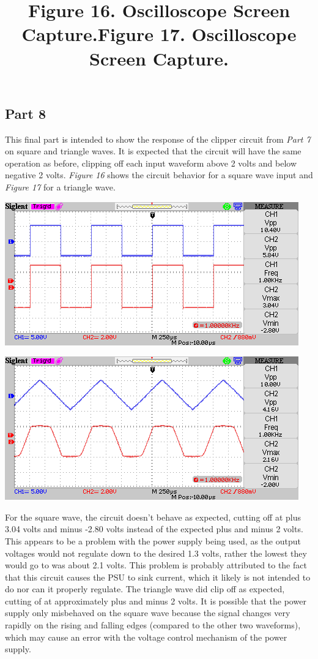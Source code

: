 \documentclass[12pt]{article}
\begin{document}
\pagebreak

\subsection*{Part 8}
This final part is intended to show the response of the clipper circuit from \textit{Part 7} on square and triangle waves. It is expected that the circuit will have the same operation as before, clipping off each input waveform above 2 volts and below negative 2 volts. \textit{Figure 16} shows the circuit behavior for a square wave input and \textit{Figure 17} for a triangle wave.\par
%
\vspace{12pt}\title{\textbf{Figure 16.} Oscilloscope Screen Capture.}
\begin{center}
  \includegraphics[scale=0.8]{./oscilloscope_captures/square.png}
\end{center}
%
\title{\textbf{Figure 17.} Oscilloscope Screen Capture.}
\begin{center}
  \includegraphics[scale=0.8]{./oscilloscope_captures/triangle.png}
\end{center}
%
For the square wave, the circuit doesn't behave as expected, cutting off at plus 3.04 volts and minus -2.80 volts instead of the expected plus and minus 2 volts. This appears to be a problem with the power supply being used, as the output voltages would not regulate down to the desired 1.3 volts, rather the lowest they would go to was about 2.1 volts. This problem is probably attributed to the fact that this circuit causes the PSU to sink current, which it likely is not intended to do nor can it properly regulate. The triangle wave did clip off as expected, cutting of at approximately plus and minus 2 volts. It is possible that the power supply only misbehaved on the square wave because the signal changes very rapidly on the rising and falling edges (compared to the other two waveforms), which may cause an error with the voltage control mechanism of the power supply.
\end{document}
